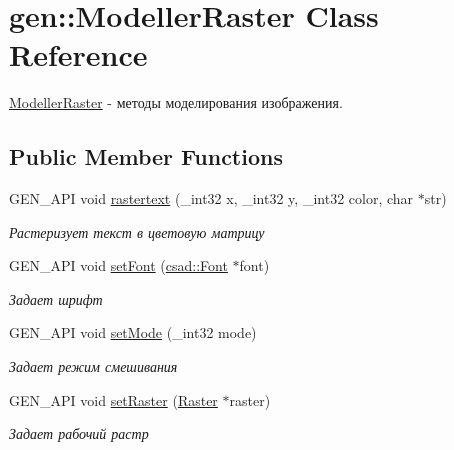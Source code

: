 \hypertarget{classgen_1_1_modeller_raster}{\section{gen\-:\-:Modeller\-Raster Class Reference}
\label{classgen_1_1_modeller_raster}
}


\hyperlink{classgen_1_1_modeller_raster}{Modeller\-Raster} -\/ методы моделирования изображения.  


\subsection*{Public Member Functions}
\begin{DoxyCompactItemize}
\item 
\hypertarget{classgen_1_1_modeller_raster_aee7897cf040faa7d32d20d2451751c1e}{G\-E\-N\-\_\-\-A\-P\-I void \hyperlink{classgen_1_1_modeller_raster_aee7897cf040faa7d32d20d2451751c1e}{rastertext} (\-\_\-int32 x, \-\_\-int32 y, \-\_\-int32 color, char $\ast$str)}\label{classgen_1_1_modeller_raster_aee7897cf040faa7d32d20d2451751c1e}

\begin{DoxyCompactList}\small\item\em Растеризует текст в цветовую матрицу \end{DoxyCompactList}\item 
\hypertarget{classgen_1_1_modeller_raster_af4ea4623ec7e3742c69011d4a7856f49}{G\-E\-N\-\_\-\-A\-P\-I void \hyperlink{classgen_1_1_modeller_raster_af4ea4623ec7e3742c69011d4a7856f49}{set\-Font} (\hyperlink{classcsad_1_1_font}{csad\-::\-Font} $\ast$font)}\label{classgen_1_1_modeller_raster_af4ea4623ec7e3742c69011d4a7856f49}

\begin{DoxyCompactList}\small\item\em Задает шрифт \end{DoxyCompactList}\item 
\hypertarget{classgen_1_1_modeller_raster_ab5641d45191594225c5581da065c6297}{G\-E\-N\-\_\-\-A\-P\-I void \hyperlink{classgen_1_1_modeller_raster_ab5641d45191594225c5581da065c6297}{set\-Mode} (\-\_\-int32 mode)}\label{classgen_1_1_modeller_raster_ab5641d45191594225c5581da065c6297}

\begin{DoxyCompactList}\small\item\em Задает режим смешивания \end{DoxyCompactList}\item 
\hypertarget{classgen_1_1_modeller_raster_adad120258b87bfdc6678cfad986d6ad9}{G\-E\-N\-\_\-\-A\-P\-I void \hyperlink{classgen_1_1_modeller_raster_adad120258b87bfdc6678cfad986d6ad9}{set\-Raster} (\hyperlink{struct_raster}{Raster} $\ast$raster)}\label{classgen_1_1_modeller_raster_adad120258b87bfdc6678cfad986d6ad9}

\begin{DoxyCompactList}\small\item\em Задает рабочий растр \end{DoxyCompactList}\end{DoxyCompactItemize}
